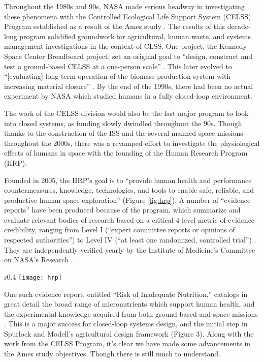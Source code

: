 Throughout the 1980s and 90s, NASA made serious headway in investigating these phenomena with the Controlled Ecological Life Support System (CELSS) Program established as a result of the Ames study \cite{CELSS_1989,CELSS_1979}. The results of this decade-long program solidified groundwork for agricultural, human waste, and systems management investigations in the context of CLSS. One project, the Kennedy Space Center Breadboard project, set an original goal to “design, construct and test a ground-based CELSS at a one-person scale” \cite{breadboard}. This later evolved to “[evaluating] long-term operation of the biomass production system with increasing material closure” \cite{breadboard_waste}. By the end of the 1990s, there had been no actual experiment by NASA which studied humans in a fully closed-loop environment.

The work of the CELSS division would also be the last major program to look into closed systems, as funding slowly dwindled throughout the 90s. Though thanks to the construction of the ISS and the several manned space missions throughout the 2000s, there was a revamped effort to investigate the physiological effects of humans in space with the founding of the Human Research Program (HRP).

Founded in 2005, the HRP’s goal is to “provide human health and performance countermeasures, knowledge, technologies, and tools to enable safe, reliable, and productive human space exploration” \cite{HRP_intro} (Figure \ref{fig:hrp}). A number of “evidence reports” have been produced because of the program, which summarize and evaluate relevant bodies of research based on a critical 4-level metric of evidence credibility, ranging from Level I (“expert committee reports or opinions of respected authorities”) to Level IV (“at least one randomized, controlled trial”) \cite{HRP_intro}. They are independently verified yearly by the Institute of Medicine’s Committee on NASA's Research \cite{HRP_review}. 

\begin{wrapfigure}{r}{0.4\textwidth}
    \centering
    \texttt{[image: hrp]}
    \caption{Human Research Program}
    \label{fig:hrp}
\end{wrapfigure}

One such evidence report, entitled “Risk of Inadequate Nutrition,” catalogs in great detail the broad range of micronutrients which support human health, and the experimental knowledge acquired from both ground-based and space missions \cite{HRP_nutrition}. This is a major success for closed-loop systems design, and the initial step in Spurlock and Modell’s agricultural design framework (Figure 3). Along with the work from the CELSS Program, it’s clear we have made some advancements in the Ames study objectives. Though there is still much to understand.

